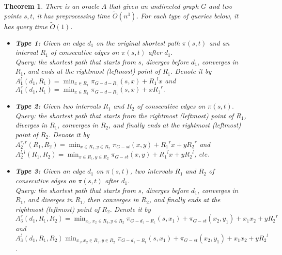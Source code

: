 \documentclass[11pt]{article}
\theoremstyle{plain}
\newtheorem{theorem}{Theorem}[section]
\theoremstyle{definition}
\newcommand{\too}[1]{\tilde{O}({#1})}
\newcommand{\zdd}[1]{{#1}^{l}}
\newcommand{\ydd}[1]{{#1}^{r}}
\begin{document}
\iffalse
\begin{theorem}
There is an oracle $A$ that given an undirected graph $G$ and two points $s,t$, it has preprocessing time $\too{n^3}.$ For each type of queries below, it has query time $\too{1}$.
\begin{itemize}
    \item \textbf{Type 1:} Given an edge $d_1$ on the original shortest path $\pi(s,t)$ and an interval $R_1$ of consecutive edges on $\pi(s,t)$ after $d_1.$ 
    ~\\Query: the shortest path that starts from $s$, diverges before $d_1$, converges in $R_1$, and ends at the rightmost (leftmost) point of $R_1.$ Denote it by $A_1^l(d_1,R_1) = \min_{x \in R_1} \pi_{G-d-R_1}(s, x) + \zdd{R_1}x$ and $A_1^r(d_1,R_1) =  \min_{x \in R_1} \pi_{G-d-R_1}(s, x) + x\ydd{R_1}.$
    \item \textbf{Type 2:} Given two intervals $R_1$ and $R_2$ of consecutive edges on $\pi(s,t).$   
    ~\\Query: the shortest path that starts from the rightmost (leftmost) point of $R_1$, diverges in $R_1$, converges in $R_2$, and finally ends at the rightmost (leftmost) point of $R_2.$ Denote it by $A_2^{r,r}(R_1,R_2) = \min_{x\in R_1, y\in R_2}\pi_{G-st}(x, y) + \ydd{R_1}x+y\ydd{R_2}$ and $A_2^{l,l}(R_1,R_2) = \min_{x\in R_1, y\in R_2}\pi_{G-st}(x, y) + \zdd{R_1}x+y\zdd{R_2}$, etc.
    \item \textbf{Type 3:} Given an edge $d_1$ on $\pi(s,t)$, two intervals $R_1$ and $R_2$ of consecutive edges on $\pi(s,t)$ after $d_1.$   
    ~\\Query: the shortest path that starts from $s$, diverges before $d_1$, converges in $R_1$, and diverges in $R_1$, then converges in $R_2$, and finally ends at the rightmost (leftmost) point of $R_2.$ Denote it by $A_3^r(d_1,R_1,R_2) = \min_{x_1, x_2\in {R_1}, y\in {R_2}} \pi_{G-d_1-R_1}(s, x_1)+\pi_{G-st}(x_2, y_1)+x_1x_2+y\ydd{R_2}$ \newline and $A_3^l(d_1,R_1,R_2)\min_{x_1, x_2\in {R_1}, y\in {R_2}} \pi_{G-d_1-R_1}(s, x_1)+\pi_{G-st}(x_2, y_1)+x_1x_2+y\zdd{R_2}$.
\end{itemize}

\end{theorem}
\end{document}
